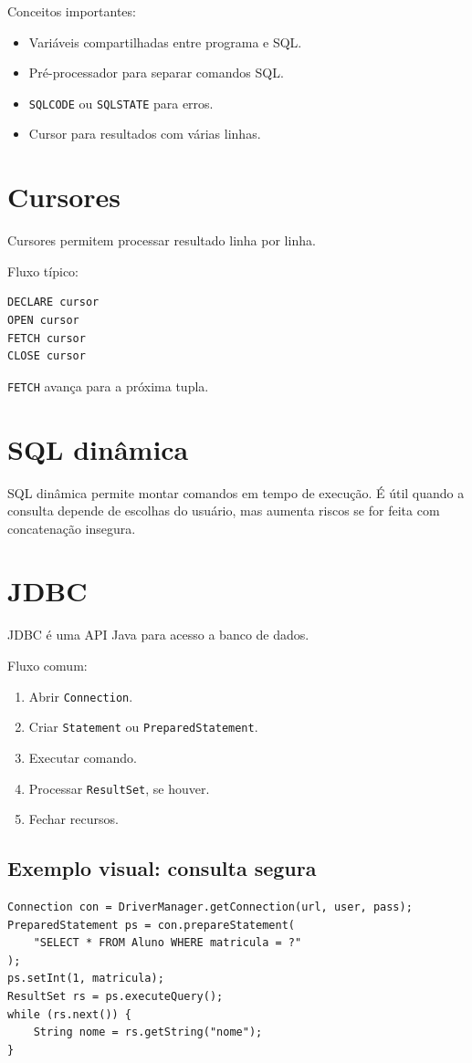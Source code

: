 \documentclass[12pt,a4paper]{article}
\begin{document}
Conceitos importantes:
\begin{itemize}
    \item Variáveis compartilhadas entre programa e SQL.
    \item Pré-processador para separar comandos SQL.
    \item \texttt{SQLCODE} ou \texttt{SQLSTATE} para erros.
    \item Cursor para resultados com várias linhas.
\end{itemize}

\section{Cursores}
Cursores permitem processar resultado linha por linha.

Fluxo típico:
\begin{verbatim}
DECLARE cursor
OPEN cursor
FETCH cursor
CLOSE cursor
\end{verbatim}

\texttt{FETCH} avança para a próxima tupla.

\section{SQL dinâmica}
SQL dinâmica permite montar comandos em tempo de execução. É útil quando a consulta depende de escolhas do usuário, mas aumenta riscos se for feita com concatenação insegura.

\section{JDBC}
JDBC é uma API Java para acesso a banco de dados.

Fluxo comum:
\begin{enumerate}
    \item Abrir \texttt{Connection}.
    \item Criar \texttt{Statement} ou \texttt{PreparedStatement}.
    \item Executar comando.
    \item Processar \texttt{ResultSet}, se houver.
    \item Fechar recursos.
\end{enumerate}

\subsection{Exemplo visual: consulta segura}
\begin{verbatim}
Connection con = DriverManager.getConnection(url, user, pass);
PreparedStatement ps = con.prepareStatement(
    "SELECT * FROM Aluno WHERE matricula = ?"
);
ps.setInt(1, matricula);
ResultSet rs = ps.executeQuery();
while (rs.next()) {
    String nome = rs.getString("nome");
}
\end{verbatim}
\end{document}
